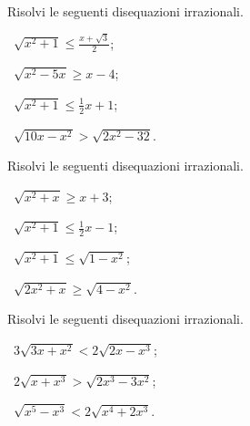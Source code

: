 \begin{esercizio}[\Ast]
 \label{ese:8.22}
Risolvi le seguenti disequazioni irrazionali.
\begin{multicols}{2}
 \begin{enumeratea}
 \item~$\sqrt{x^2+1}\le \frac{x+\sqrt 3} 2$;
 \item~$\sqrt{x^2-5x}\ge x-4$;
 \item~$\sqrt{x^2+1}\le \frac 1 2x+1$;
 \item~$\sqrt{10x-x^2}>\sqrt{2x^2-32}$.
 \end{enumeratea}
 \end{multicols}
\end{esercizio}

\begin{esercizio}[\Ast]
 \label{ese:8.23}
Risolvi le seguenti disequazioni irrazionali.
\begin{multicols}{2}
 \begin{enumeratea}
 \item~$\sqrt{x^2+x}\ge x+3$;
 \item~$\sqrt{x^2+1}\le \frac 1 2x-1$;
 \item~$\sqrt{x^2+1}\le \sqrt{1-x^2}$;
 \item~$\sqrt{2x^2+x}\ge \sqrt{4-x^2}$.
 \end{enumeratea}
 \end{multicols}
\end{esercizio}

\begin{esercizio}[\Ast]
 \label{ese:8.24}
Risolvi le seguenti disequazioni irrazionali.
\begin{multicols}{2}
 \begin{enumeratea}
 \item~$3\sqrt{3x+x^2}<2\sqrt{2x-x^3}$;
 \item~$2\sqrt{x+x^3}>\sqrt{2x^3-3x^2}$;
 \item~$\sqrt{x^5-x^3}<2\sqrt{x^4+2x^3}$.
 \end{enumeratea}
 \end{multicols}
\end{esercizio}
\newpage
